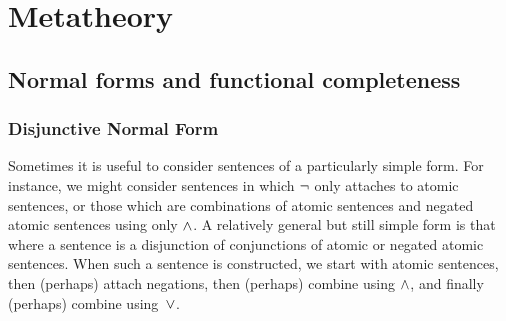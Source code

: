 \part{Metatheory}
\label{ch.normalform}

\chapter[Normal forms]{Normal forms and functional completeness}


\section{Disjunctive Normal Form}\label{s:DNFDefined}

Sometimes it is useful to consider sentences of a particularly simple form. For instance, we might consider sentences in which $\neg$ only attaches to atomic sentences, or those which are combinations of atomic sentences and negated atomic sentences using only $\wedge$.  A relatively general but still simple form is that where a sentence is a disjunction of conjunctions of atomic or negated atomic sentences.  When such a sentence is constructed, we start with atomic sentences, then (perhaps) attach negations, then (perhaps) combine using $\wedge$, and finally (perhaps) combine using~$\vee$. 

